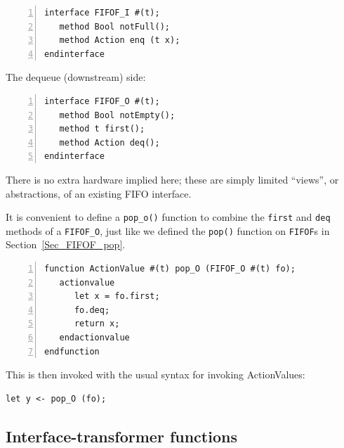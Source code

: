 {\footnotesize
\begin{Verbatim}[frame=single, numbers=left]
interface FIFOF_I #(t);
   method Bool notFull();
   method Action enq (t x);
endinterface
\end{Verbatim}
}

The dequeue (downstream) side:


{\footnotesize
\begin{Verbatim}[frame=single, numbers=left]
interface FIFOF_O #(t);
   method Bool notEmpty();
   method t first();
   method Action deq();
endinterface
\end{Verbatim}
}

There is no extra hardware implied here; these are simply limited
``views'', or abstractions, of an existing FIFO interface.


It is convenient to define a \verb|pop_o()| function to combine the
{\tt first} and {\tt deq} methods of a {\tt FIFOF\_O}, just like we
defined the {\tt pop()} function on {\tt FIFOF}s in
Section~\ref{Sec_FIFOF_pop}.

{\footnotesize
\begin{Verbatim}[frame=single, numbers=left]
function ActionValue #(t) pop_O (FIFOF_O #(t) fo);
   actionvalue
      let x = fo.first;
      fo.deq;
      return x;
   endactionvalue
endfunction
\end{Verbatim}
}

This is then invoked with the usual syntax for invoking ActionValues:

{\footnotesize
\begin{Verbatim}[frame=single]
   let y <- pop_O (fo);
\end{Verbatim}
}


\subsection{Interface-transformer functions}

\label{Sec_interface_transfomers}


